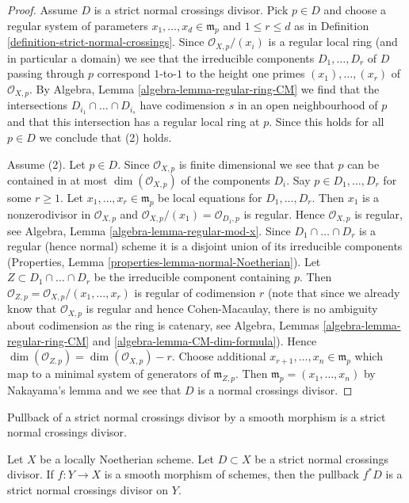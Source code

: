 \begin{proof}
Assume $D$ is a strict normal crossings divisor. Pick $p \in D$
and choose a regular system of parameters $x_1, \ldots, x_d \in \mathfrak m_p$
and $1 \leq r \leq d$ as in
Definition \ref{definition-strict-normal-crossings}.
Since $\mathcal{O}_{X, p}/(x_i)$ is a regular local ring
(and in particular a domain) we see that the irreducible components
$D_1, \ldots, D_r$ of $D$ passing through $p$ correspond $1$-to-$1$
to the height one primes $(x_1), \ldots, (x_r)$ of $\mathcal{O}_{X, p}$.
By Algebra, Lemma \ref{algebra-lemma-regular-ring-CM}
we find that the intersections $D_{i_1} \cap \ldots \cap D_{i_s}$
have codimension $s$ in an open neighbourhood of $p$
and that this intersection has a regular local ring at $p$.
Since this holds for all $p \in D$ we conclude that (2) holds.

\medskip\noindent
Assume (2). Let $p \in D$. Since $\mathcal{O}_{X, p}$ is finite
dimensional we see that $p$ can be contained in at most
$\dim(\mathcal{O}_{X, p})$ of the components $D_i$.
Say $p \in D_1, \ldots, D_r$ for some $r \geq 1$.
Let $x_1, \ldots, x_r \in \mathfrak m_p$ be local equations
for $D_1, \ldots, D_r$. Then $x_1$ is a nonzerodivisor in $\mathcal{O}_{X, p}$
and $\mathcal{O}_{X, p}/(x_1) = \mathcal{O}_{D_1, p}$ is regular.
Hence $\mathcal{O}_{X, p}$ is regular, see
Algebra, Lemma \ref{algebra-lemma-regular-mod-x}.
Since $D_1 \cap \ldots \cap D_r$ is a regular (hence normal) scheme
it is a disjoint union of its irreducible components
(Properties, Lemma \ref{properties-lemma-normal-Noetherian}).
Let $Z \subset D_1 \cap \ldots \cap D_r$
be the irreducible component containing $p$.
Then $\mathcal{O}_{Z, p} = \mathcal{O}_{X, p}/(x_1, \ldots, x_r)$
is regular of codimension $r$ (note that since we already know
that $\mathcal{O}_{X, p}$ is regular and hence Cohen-Macaulay,
there is no ambiguity about codimension as the ring is catenary, see
Algebra, Lemmas \ref{algebra-lemma-regular-ring-CM} and
\ref{algebra-lemma-CM-dim-formula}).
Hence $\dim(\mathcal{O}_{Z, p}) = \dim(\mathcal{O}_{X, p}) - r$.
Choose additional $x_{r + 1}, \ldots, x_n \in \mathfrak m_p$
which map to a minimal system of generators of $\mathfrak m_{Z, p}$.
Then $\mathfrak m_p = (x_1, \ldots, x_n)$ by Nakayama's lemma
and we see that $D$ is a normal crossings divisor.
\end{proof}

\begin{lemma}
\label{lemma-smooth-pullback-strict-normal-crossings}
\begin{slogan}
Pullback of a strict normal crossings divisor by a smooth
morphism is a strict normal crossings divisor.
\end{slogan}
Let $X$ be a locally Noetherian scheme. Let $D \subset X$ be a
strict normal crossings divisor. If $f : Y \to X$ is a smooth
morphism of schemes, then the pullback $f^*D$ is a
strict normal crossings divisor on $Y$.
\end{lemma}

